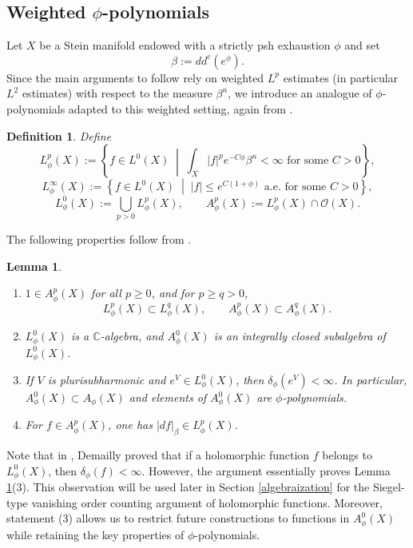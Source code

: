 \documentclass[a4paper, 12pt]{article}
\newcommand{\bC}{\mathbb{C}}
\newcommand{\cO}{\mathcal{O}}
\newtheorem{defn}[thm]{Definition}
\newtheorem{lem}[thm]{Lemma}
\begin{document}
\subsection{Weighted $\phi$-polynomials}

Let $X$ be a Stein manifold endowed with a strictly psh exhaustion $\phi$ and set
\[
\beta := dd^c(e^\phi).
\]
Since the main arguments to follow rely on weighted $L^p$ estimates (in particular $L^2$ estimates) with respect to the measure $\beta^n$, we introduce an analogue of $\phi$-polynomials adapted to this weighted setting, again from \cite{D85}.

\begin{defn}\label{weighted}
Define
\[
L_\phi^p(X):=\left\{f\in L^0(X)\;\middle|\; \int_X |f|^p e^{-C\phi}\beta^n<\infty \text{ for some } C>0 \right\},
\]
\[
L_\phi^\infty(X):=\left\{f\in L^0(X)\;\middle|\; |f|\le e^{C(1+\phi)} \text{ a.e. for some } C>0 \right\},
\]
\[
L_\phi^0(X):=\bigcup_{p>0} L_\phi^p(X), \qquad 
A_\phi^p(X):=L_\phi^p(X)\cap \cO(X).
\]
\end{defn}

The following properties follow from \cite[Lemmas 11.2 and 11.3]{D85}.

\begin{lem}\label{weightphi}
\begin{enumerate}
\item $1\in A_\phi^p(X)$ for all $p\ge 0$, and for $p\ge q>0$,
\[
L_\phi^p(X)\subset L_\phi^q(X), \qquad A_\phi^p(X)\subset A_\phi^q(X).
\]

\item $L_\phi^0(X)$ is a $\bC$-algebra, and $A_\phi^0(X)$ is an integrally closed subalgebra of $L_\phi^0(X)$.

\item If $V$ is plurisubharmonic and $e^V \in L_\phi^0(X)$, then $\delta_\phi(e^V) < \infty$. In particular, $A_\phi^0(X) \subset A_\phi(X)$ and elements of $A_\phi^0(X)$ are $\phi$-polynomials.

\item For $f\in A_\phi^p(X)$, one has $|df|_\beta\in L_\phi^p(X)$.
\end{enumerate}
\end{lem}

Note that in \cite[Lemma 11.3(a)]{D85}, Demailly proved that if a holomorphic function $f$ belongs to $L_\phi^0(X)$, then $\delta_\phi(f) < \infty$. However, the argument essentially proves Lemma \ref{weightphi}(3). This observation will be used later in Section \ref{algebraization} for the Siegel-type vanishing order counting argument of holomorphic functions. Moreover, statement (3) allows us to restrict future constructions to functions in $A_\phi^0(X)$ while retaining the key properties of $\phi$-polynomials.
\end{document}

